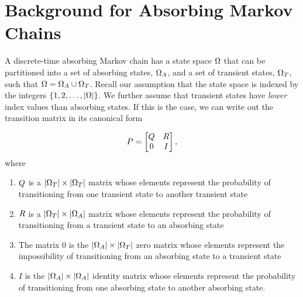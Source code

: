 \section{Background for Absorbing Markov Chains}

A discrete-time absorbing Markov chain has a state space $\Omega$ that can be partitioned into a set of absorbing states, $\Omega_{A}$, and a set of transient states, $\Omega_{T}$, such that $\Omega = \Omega_{A} \cup \Omega_{T}$.  Recall our assumption that the state space is indexed by the integers $\{1, 2, \ldots, |\Omega|\}$.  We further assume that transient states have \emph{lower} index values than absorbing states.  If this is the case, we can write out the transition matrix in its canonical form 

\begin{equation}
	\label{eq:transM}
	P = 
	\begin{bmatrix}
		Q & R \\ 
		0 & I
	\end{bmatrix},
\end{equation}
%
where
\begin{enumerate}
	\item $Q$ is a $|\Omega_{T}| \times |\Omega_{T}|$ matrix whose elements represent the probability of transitioning from one transient state to another transient state
	\item $R$ is a $|\Omega_{T}| \times |\Omega_{A}|$ matrix whose elements represent the probability of transitioning from a transient state to an absorbing state
	\item The matrix $0$ is the $|\Omega_{A}| \times |\Omega_{T}|$ zero matrix whose elements represent the impossibility of transitioning from an absorbing state to a transient state
	\item $I$ is the $|\Omega_{A}| \times |\Omega_{A}|$ identity matrix whose elements represent the probability of transitioning from one absorbing state to another absorbing state.
\end{enumerate}


